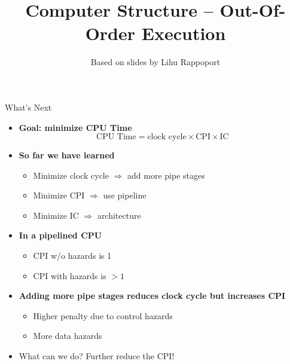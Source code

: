 \documentclass[aspectratio=169,12pt]{beamer}
\title{Computer Structure -- Out-Of-Order Execution}
\author{Based on slides by Lihu Rappoport}
\date{}
\begin{document}
\begin{frame}
  \titlepage
\end{frame}

\begin{frame}{What's Next}
  \begin{itemize}
    \item \textbf{Goal: minimize CPU Time}
    \begin{equation*}
      \text{CPU Time} = \text{clock cycle} \times \text{CPI} \times \text{IC}
    \end{equation*}
    
    \item \textbf{So far we have learned}
    \begin{itemize}
      \item Minimize clock cycle $\Rightarrow$ add more pipe stages
      \item Minimize CPI $\Rightarrow$ use pipeline
      \item Minimize IC $\Rightarrow$ architecture
    \end{itemize}
    
    \item \textbf{In a pipelined CPU}
    \begin{itemize}
      \item CPI w/o hazards is 1
      \item CPI with hazards is $> 1$
    \end{itemize}
    
    \item \textbf{Adding more pipe stages reduces clock cycle but increases CPI}
    \begin{itemize}
      \item Higher penalty due to control hazards
      \item More data hazards
    \end{itemize}
    
    \item \alert{What can we do? Further reduce the CPI!}
  \end{itemize}
\end{frame}
\end{document}
